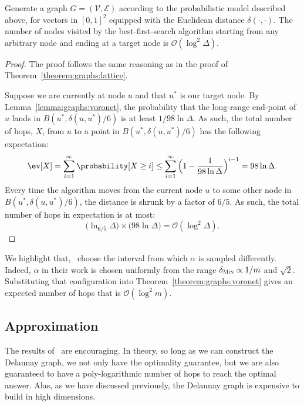 \begin{theorem}
    \label{theorem:graphs:voronet}
    Generate a graph $G = (\mathcal{V}, \mathcal{E})$ according to the probabilistic
    model described above, for vectors in $[0, 1]^2$ equipped with the
    Euclidean distance $\delta(\cdot, \cdot)$.
    The number of nodes visited by the best-first-search algorithm
    starting from any arbitrary node and ending at a target node is $\mathcal{O}(\log^2 \Delta)$.
\end{theorem}
\begin{proof}
    The proof follows the same reasoning as in the proof of Theorem~\ref{theorem:graphs:lattice}.

    Suppose we are currently at node $u$ and that $u^\ast$ is our target node.
    By Lemma~\ref{lemma:graphs:voronet}, the probability that the long-range end-point
    of $u$ lands in $B(u^\ast, \delta(u, u^\ast)/6)$ is at least $1/98 \ln \Delta$.
    As such, the total number of hops, $X$, from $u$ to a point in $B(u^\ast, \delta(u, u^\ast)/6)$
    has the following expectation:
    \begin{equation*}
        \ev [ X ] = \sum_{i = 1}^{\infty} \probability [X \geq i] \leq
        \sum_{i = 1}^\infty \Big( 1 - \frac{1}{98 \ln \Delta} \Big)^{i - 1} = 98 \ln \Delta.
    \end{equation*}
    Every time the algorithm moves from the current node $u$ to some other node in
    $B(u^\ast, \delta(u, u^\ast)/6)$, the distance is shrunk by a factor of $6/5$.
    As such, the total number of hops in expectation is at most:
    \begin{equation*}
        \Big( \ln_{6/5} \Delta \Big) \times \Big( 98 \ln \Delta \Big) = \mathcal{O}(\log^2 \Delta).
    \end{equation*}
\end{proof}

We highlight that,~\cite{voronet2007} choose the interval from which $\alpha$
is sampled differently. Indeed, $\alpha$ in their work is chosen uniformly from
the range $\delta_\textsc{Min} \propto 1/m$ and $\sqrt{2}$.
Substituting that configuration into Theorem~\ref{theorem:graphs:voronet} gives
an expected number of hops that is $\mathcal{O}(\log^2 m)$.

\subsection{Approximation}
The results of~\cite{voronet2007} are encouraging. In theory, so long as
we can construct the Delaunay graph, we not only have the optimality guarantee,
but we are also guaranteed to have a poly-logarithmic number of hops to
reach the optimal answer. Alas, as we have discussed previously, the Delaunay
graph is expensive to build in high dimensions.

